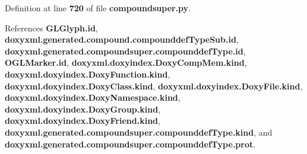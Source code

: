 Definition at line {\bf 720} of file {\bf compoundsuper.\+py}.



References {\bf G\+L\+Glyph.\+id}, {\bf doxyxml.\+generated.\+compound.\+compounddef\+Type\+Sub.\+id}, {\bf doxyxml.\+generated.\+compoundsuper.\+compounddef\+Type.\+id}, {\bf O\+G\+L\+Marker.\+id}, {\bf doxyxml.\+doxyindex.\+Doxy\+Comp\+Mem.\+kind}, {\bf doxyxml.\+doxyindex.\+Doxy\+Function.\+kind}, {\bf doxyxml.\+doxyindex.\+Doxy\+Class.\+kind}, {\bf doxyxml.\+doxyindex.\+Doxy\+File.\+kind}, {\bf doxyxml.\+doxyindex.\+Doxy\+Namespace.\+kind}, {\bf doxyxml.\+doxyindex.\+Doxy\+Group.\+kind}, {\bf doxyxml.\+doxyindex.\+Doxy\+Friend.\+kind}, {\bf doxyxml.\+generated.\+compoundsuper.\+compounddef\+Type.\+kind}, and {\bf doxyxml.\+generated.\+compoundsuper.\+compounddef\+Type.\+prot}.



